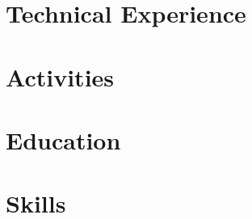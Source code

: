 \documentclass[letter,10pt]{article}
\begin{document}
% 

\section{Technical Experience}


\newpage

\section{Activities}


\section{Education}


\section{Skills}

\end{document}
